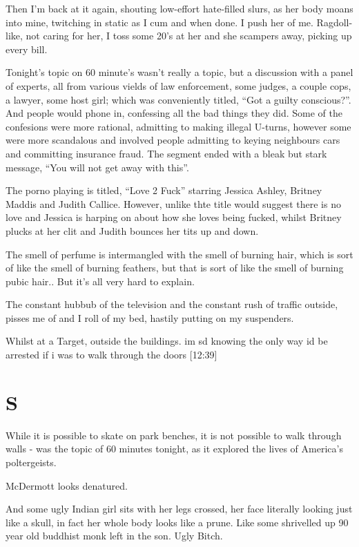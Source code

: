 \documentclass[19pt,openany]{book}
\begin{document}
Then I'm back at it again, shouting low-effort hate-filled slurs, as her body
moans into mine, twitching
in static as I cum and when done. I push her of me. Ragdoll-like, not caring for her, I toss some 20's at her and she scampers away, picking up every bill.

Tonight's topic on 60 minute's wasn't really a topic, but a discussion with a panel of experts, all from various vields of law enforcement, some judges, a couple
cops, a lawyer, some host girl; which was conveniently titled, ``Got a guilty
conscious?''. And people would phone in, confessing all the bad things they did.
Some of the confesions were more rational, admitting to making illegal
U-turns, however some were more scandalous and involved people admitting to
keying neighbours cars and committing insurance fraud. The segment ended with a bleak but stark message, ``You will not get away with this''.

The porno playing is titled, ``Love 2 Fuck'' starring Jessica Ashley, Britney
Maddis and Judith Callice. However, unlike thte title would suggest there
is no love and Jessica is harping on about how she loves being fucked, whilst
Britney plucks at her clit and Judith bounces her tits up and down.

The smell of perfume is intermangled with the smell of burning hair, which
is sort of like the smell of burning feathers, but that is sort of like
the smell of burning pubic hair.. But it's all very hard to explain.

The constant hubbub of the television and the constant rush of traffic outside, pisses me of and I roll of my bed, hastily putting on my suspenders.

Whilst at a Target, outside the buildings.
im sd knowing the only way id be arrested if i was to walk through the doors
[12:39]

\chapter{S}
While it is possible to skate
on park benches, it is not possible
to walk through walls - was the topic
of 60 minutes tonight, as it explored the lives
of America's poltergeists.

McDermott looks denatured.

And some ugly Indian girl sits with her legs
crossed, her face literally looking just like
a skull, in fact her whole body looks like a prune.
Like some shrivelled up 90 year old buddhist monk left in
the son. Ugly Bitch.
\end{document}
